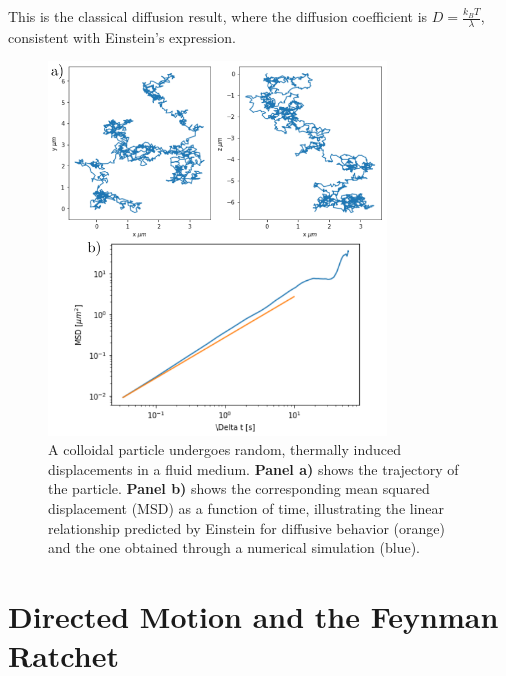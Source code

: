 This is the classical diffusion result, where the diffusion coefficient is \( D = \frac{k_B T}{\lambda} \), consistent with Einstein's expression.





\begin{figure}[H]
  \begin{center}
    \includegraphics[width=0.8\textwidth]{figures/passivebrowniantrajectorymsd.png}
  \end{center}
  \caption[Example of brownian motion]{A colloidal particle undergoes random, thermally induced displacements in a fluid medium. \textbf{Panel a)} shows the trajectory of the particle. \textbf{ Panel b)} shows the corresponding mean squared displacement (MSD) as a function of time, illustrating the linear relationship predicted by Einstein for diffusive behavior (orange) and the one obtained through a numerical simulation (blue).}\label{fig:passivebrowniantrajectory}
\end{figure}

\section{Directed Motion and the Feynman Ratchet}

